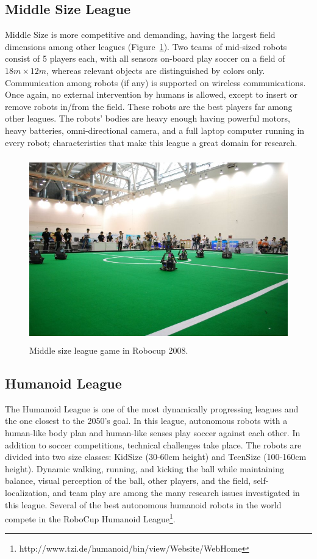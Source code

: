 \subsection{Middle Size League}

Middle Size is more competitive and demanding, having the largest field dimensions among other leagues (Figure~\ref{fig:middleSize}). Two teams of mid-sized robots consist of 5 players each, with all sensors on-board play soccer on a field of $18 m \times 12 m$, whereas relevant objects are distinguished by colors only. Communication among robots (if any) is supported on wireless communications. Once again, no external intervention by humans is allowed, except to insert or remove robots in/from the field. These robots are the best players far among other leagues. The robots' bodies are heavy enough having powerful motors, heavy batteries, omni-directional camera, and a full laptop computer running in every robot; characteristics that make this league a great domain for research.


\begin{figure}[h]
	\begin{center}
		\includegraphics[height = 8cm]{Chapter1/figures/middleSize1.jpg}
		\caption{Middle size league game in Robocup 2008.}
 		\label{fig:middleSize}
	\end{center}
\end{figure}

\subsection{Humanoid League}

The Humanoid League is one of the most dynamically progressing leagues and the one closest to the 2050's goal. In this league, autonomous robots with a human-like body plan and human-like senses play soccer against each other. In addition to soccer competitions, technical challenges take place. The robots are divided into two size classes: KidSize (30-60cm height) and TeenSize (100-160cm height). Dynamic walking, running, and kicking the ball while maintaining balance, visual perception of the ball, other players, and the field, self-localization, and team play are among the many research issues investigated in this league. Several of the best autonomous humanoid robots in the world compete in the RoboCup Humanoid League\footnote{http://www.tzi.de/humanoid/bin/view/Website/WebHome}.

